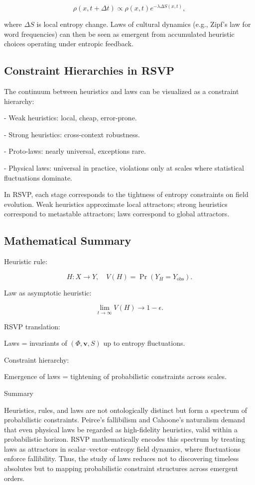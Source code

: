 \documentclass[12pt]{book}
\begin{document}
\[ \rho(x, t+\Delta t) \propto \rho(x,t) e^{-\lambda \Delta S(x,t)}, \]

where \( \Delta S \) is local entropy change. Laws of cultural dynamics (e.g., Zipf’s law for word frequencies) can then be seen as emergent from accumulated heuristic choices operating under entropic feedback.

\subsection{Constraint Hierarchies in RSVP}
The continuum between heuristics and laws can be visualized as a constraint hierarchy:

- Weak heuristics: local, cheap, error-prone.

- Strong heuristics: cross-context robustness.

- Proto-laws: nearly universal, exceptions rare.

- Physical laws: universal in practice, violations only at scales where statistical fluctuations dominate.

In RSVP, each stage corresponds to the tightness of entropy constraints on field evolution. Weak heuristics approximate local attractors; strong heuristics correspond to metastable attractors; laws correspond to global attractors.

\subsection{Mathematical Summary}
Heuristic rule:

\[ H: X \to Y, \quad V(H) = \Pr(Y_H = Y_{\text{obs}}). \]

Law as asymptotic heuristic:

\[ \lim_{t \to \infty} V(H) \to 1 - \epsilon. \]

RSVP translation:

Laws = invariants of \( (\Phi, \mathbf{v}, S) \) up to entropy fluctuations.

Constraint hierarchy:

Emergence of laws = tightening of probabilistic constraints across scales.

Summary

Heuristics, rules, and laws are not ontologically distinct but form a spectrum of probabilistic constraints. Peirce’s fallibilism and Cahoone’s naturalism demand that even physical laws be regarded as high-fidelity heuristics, valid within a probabilistic horizon. RSVP mathematically encodes this spectrum by treating laws as attractors in scalar–vector–entropy field dynamics, where fluctuations enforce fallibility. Thus, the study of laws reduces not to discovering timeless absolutes but to mapping probabilistic constraint structures across emergent orders.
\end{document}
